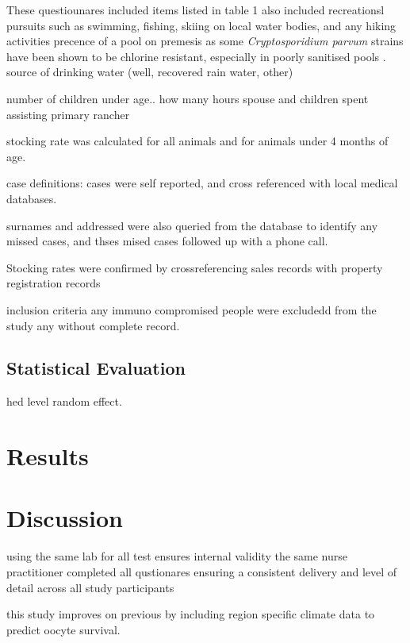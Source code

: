 \documentclass[12pt]{article}
\begin{document}
		These questiounares included items listed in table 1
		also included recreationsl pursuits such as swimming, fishing, skiing on local water bodies, and any hiking activities 
		precence of a pool on premesis as some \emph{Cryptosporidium parvum} strains have been shown to be chlorine resistant, especially in poorly sanitised pools \cite{Carpenter1999}.
		source of drinking water (well, recovered rain water, other)

		number of children under age..
		how many hours spouse and children spent assisting primary rancher 
		
		stocking rate was calculated for all animals and for animals under 4 months of age.	%

		case definitions:
		cases were self reported, and cross referenced with local medical databases.
		
		surnames and addressed were also queried from the database to identify any missed cases, and thses mised cases followed up with a phone call.
		



		Stocking rates were confirmed by crossreferencing sales records with property registration records
		
		inclusion criteria
			any immuno compromised people were excludedd from the study
			any without complete record.

	\subsection{Statistical Evaluation}
		hed level random effect.

	\section{Results}
	

	\section{Discussion} 


		using the same lab for all test ensures internal validity
		the same nurse practitioner completed all qustionares ensuring a consistent delivery and level of detail across all study participants
		
		this study improves on previous by including region specific climate data \cite{CIMIS} to predict oocyte survival. 
\end{document}

